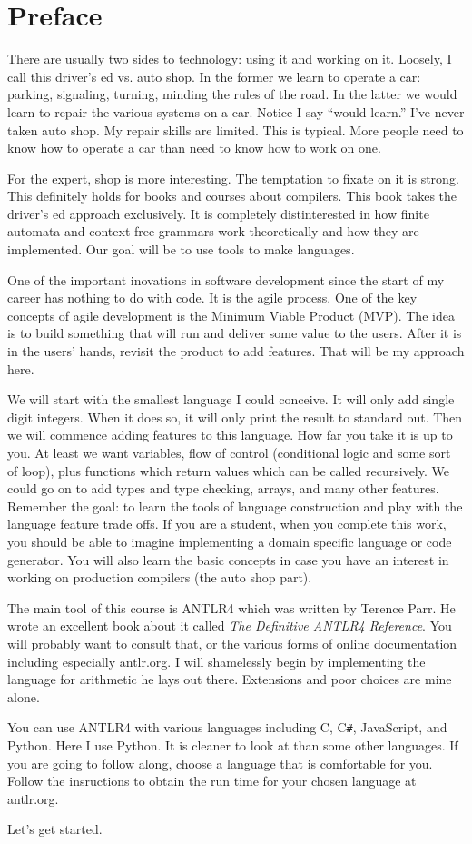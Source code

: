 \chapter*{Preface}

There are usually two sides to technology: using it and working on it.
Loosely, I call this driver's ed vs. auto shop. In the former we learn
to operate a car: parking, signaling, turning, minding the rules of the
road. In the latter we would learn to repair the various systems on
a car. Notice I say ``would learn.'' I've never taken auto shop. My
repair skills are limited. This is typical. More people need to know
how to operate a car than need to know how to work on one.

For the expert, shop is more interesting. The temptation to fixate on it
is strong. This definitely holds for books and courses about compilers.
This book takes the driver's ed approach exclusively. It is completely
distinterested in how finite automata and context free grammars work
theoretically and how they are implemented. Our goal will be to use
tools to make languages.

One of the important inovations in software development since the start
of my career has nothing to do with code. It is the
agile process. One of the key concepts of agile development is the Minimum
Viable Product (MVP). The idea is to build something that will run and
deliver some value to the users. After it is in the users' hands, revisit
the product to add features. That will be my approach here.

We will start with the smallest language I could conceive. It will only add
single digit integers. When it does so, it will only print the
result to standard out. Then we will commence adding features to this
language. How far you take it is up to you. At least we want variables,
flow of control (conditional logic and some sort of loop), plus
functions which return values which can be called recursively.
We could go on to add types and type checking, arrays, and many other
features. Remember the goal: to learn the tools of language construction
and play with the language feature trade offs. If you are a student,
when you complete this work, you should be able to imagine implementing
a domain specific language or code generator. You will also learn
the basic concepts in case you have an interest in working on production
compilers (the auto shop part).

The main tool of this course is ANTLR4 which was written by Terence Parr.
He wrote an excellent book about it called
{\it The Definitive ANTLR4 Reference}.
You will probably want to consult that, or the various forms of online
documentation including especially antlr.org. I will shamelessly begin
by implementing the language for arithmetic he lays out there. Extensions
and poor choices are mine alone.

You can use ANTLR4 with various languages including C, C\verb+#+, JavaScript,
and Python. Here I use Python. It is cleaner to look at than some
other languages. If you are going to follow along, choose a language
that is comfortable for you. Follow the insructions to obtain the
run time for your chosen language at antlr.org.

Let's get started.
